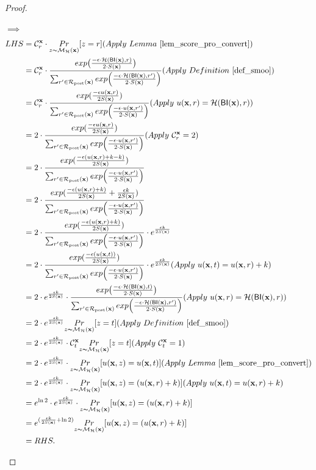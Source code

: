 \documentclass{article}
\begin{document}
\begin{proof}
\begin{itemize}
      $\implies$
      \begin{equation*}
      \begin{split}
      LHS   
      & = \cardinality{\dataobs}{r} \cdot \hexpmechPr{\dataobs}{z = r}     (Apply\ Lemma\ \ref{lem_score_pro_convert})\\
      & = \cardinality{\dataobs}{r} \cdot \frac {exp\big(\frac{-\epsilon\cdot\hellinger(\bysinfer(\dataobs),r)}{2\cdot S(\dataobs)}\big)}{\nomalizer{\dataobs}} 
      (Apply\ Definition\ \ref{def_smoo})\\
      & = \cardinality{\dataobs}{r} \cdot \frac{exp(\frac{-\epsilon \ux{r}}{2 S(\dataobs)})}{\unomalizer{\dataobs}}
      (Apply\ \ux{r} = \hellinger(\bysinfer(\dataobs), r))\\
      & = 2 \cdot \frac{exp(\frac{-\epsilon \ux{r}}{2 S(\dataobs)})}{\unomalizer{\dataobs}}                  (Apply \ \cardinality{\dataobs}{r} = 2)\\
      & = 2 \cdot \frac{exp(\frac{-\epsilon (\ux{r} + k - k)}{2 S(\dataobs)})}{\unomalizer{\dataobs}}\\
      & = 2 \cdot \frac{exp(\frac{-\epsilon (\ux{r} + k)}{2 S(\dataobs)} + \frac{\epsilon k}{2 S(\dataobs)})}{\unomalizer{\dataobs}}\\
      & = 2 \cdot \frac{exp(\frac{-\epsilon (\ux{r} + k)}{2 S(\dataobs)})}{\unomalizer{\dataobs}} \cdot e^{\frac{\epsilon k}{2 S(\dataobs)}}\\
      & = 2 \cdot \frac{exp(\frac{-\epsilon (\ux{t})}{2 S(\dataobs)})}{\unomalizer{\dataobs}} \cdot e^{\frac{\epsilon k}{2 S(\dataobs)}}  (Apply \ \ux{t} = \ux{r} + k)\\
      & = 2 \cdot e^{\frac{\epsilon k}{2 S(\dataobs)}} \cdot \frac {exp\big(\frac{-\epsilon\cdot\hellinger(\bysinfer(\dataobs), t)}{2\cdot S(\dataobs)}\big)}{\nomalizer{\dataobs}} 
      (Apply\ \ux{r} = \hellinger(\bysinfer(\dataobs), r))\\
      & = 2 \cdot e^{\frac{\epsilon k}{2 S(\dataobs)}} \hexpmechPr{\dataobs}{z = t}       (Apply\ Definition\ \ref{def_smoo})\\
      & = 2 \cdot e^{\frac{\epsilon k}{2 S(\dataobs)}} \cdot \cardinality{\dataobs}{t} \hexpmechPr{\dataobs}{z = t} (Apply\ \cardinality{\dataobs}{t} = 1)\\
      & = 2 \cdot e^{\frac{\epsilon k}{2 S(\dataobs)}} \cdot \hexpmechPr{\dataobs}{\ux{z} = \ux{t}}       (Apply \ Lemma\ \ref{lem_score_pro_convert})\\
      & = 2 \cdot e^{\frac{\epsilon k}{2 S(\dataobs)}} \cdot \hexpmechPr{\dataobs}{\ux{z} = (\ux{r} + k)} (Apply \ \ux{t} = \ux{r} + k)\\
      & = e^{\ln 2} \cdot e^{\frac{\epsilon k}{2 S(\dataobs)}} \cdot \hexpmechPr{\dataobs}{\ux{z} = (\ux{r} + k)}\\
      & = e^{(\frac{\epsilon k}{2 S(\dataobs)} + \ln 2)} \hexpmechPr{\dataobs}{\ux{z} = (\ux{r} + k)}\\
      & = RHS.
      \end{split}
      \end{equation*} 


\end{itemize}
\end{proof}
\end{document}
